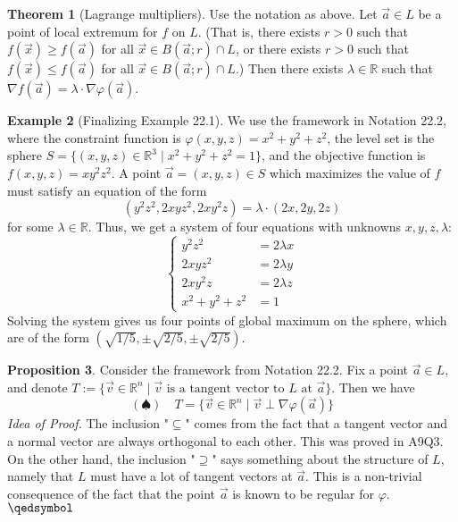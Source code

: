 \documentclass[11pt]{article}
\theoremstyle{definition}
\newtheorem{thm}{Theorem}[section]
\newtheorem{exmp}[thm]{Example}
\newtheorem{prop}[thm]{Proposition}
\newcommand{\R}{\ensuremath{\mathbb{R}}}
\begin{document}
\begin{thm}[Lagrange multipliers]
Use the notation as above. Let $\vec{a} \in L$ be a point of local extremum for $f$ on $L$. (That is, there exists $r > 0$ such that $f(\vec{x}) \geq f(\vec{a})$ for all $\vec{x} \in B(\vec{a}; r) \cap L$, or there exists $r > 0$ such that $f(\vec{x}) \leq f(\vec{a})$ for all $\vec{x} \in B(\vec{a}; r) \cap L$.) Then there exists $\lambda \in \R$ such that $\nabla f(\vec{a}) = \lambda \cdot \nabla \varphi(\vec{a})$.
\end{thm}

\begin{exmp}[Finalizing Example 22.1]
We use the framework in Notation 22.2, where the constraint function is $\varphi(x, y, z) = x^2 + y^2 + z^2$, the level set is the sphere $S = \{(x, y, z) \in \R^3 \mid x^2 + y^2 + z^2 = 1\}$, and the objective function is $f(x, y, z) = xy^2z^2$. A point $\vec{a} = (x, y, z) \in S$ which maximizes the value of $f$ must satisfy an equation of the form
$$(y^2z^2, 2xyz^2, 2xy^2z) = \lambda \cdot (2x, 2y, 2z)$$
for some $\lambda \in \R$. Thus, we get a system of four equations with unknowns $x, y, z, \lambda$:
$$\begin{cases}
    y^2z^2 &= 2\lambda x \\
    2xyz^2 &= 2\lambda y \\
    2xy^2z &= 2\lambda z \\
    x^2 + y^2 + z^2 &= 1
\end{cases}$$
Solving the system gives us four points of global maximum on the sphere, which are of the form $(\sqrt{1/5}, \pm\sqrt{2/5}, \pm\sqrt{2/5})$.
\end{exmp}

\begin{prop}
Consider the framework from Notation 22.2. Fix a point $\vec{a} \in L$, and denote $T := \{\vec{v} \in \R^n \mid \vec{v} \text{ is a tangent vector to $L$ at $\vec{a}$}\}$. Then we have
$$(\spadesuit) \quad T = \{\vec{v} \in \R^n \mid \vec{v} \perp \nabla \varphi(\vec{a})\}$$
\emph{Idea of Proof.} The inclusion "$\subseteq$" comes from the fact that a tangent vector and a normal vector are always orthogonal to each other. This was proved in A9Q3. On the other hand, the inclusion "$\supseteq$" says something about the structure of $L$, namely that $L$ must have a lot of tangent vectors at $\vec{a}$. This is a non-trivial consequence of the fact that the point $\vec{a}$ is known to be regular for $\varphi$. \hfill $\qedsymbol$
\end{prop}
\end{document}
